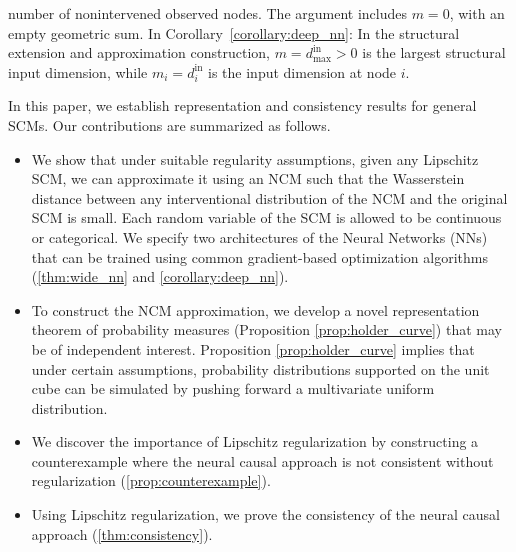 \documentclass[12pt]{article}
\theoremstyle{plain}
\theoremstyle{definition}
\theoremstyle{remark}
\begin{document}
number of nonintervened observed nodes. The argument includes $m=0$, with an empty geometric sum. In Corollary~\ref{corollary:deep_nn}: In the structural extension and approximation construction, $m=d_{\max}^{\text{in}}>0$ is the largest structural input dimension, while $m_i=d_i^{\text{in}}$ is the input dimension at node $i$.


In this paper, we establish representation and consistency results for general SCMs. Our contributions are summarized as follows.
\begin{itemize}
  \item We show that under suitable regularity assumptions, given any Lipschitz SCM, we can approximate it using an NCM such that the Wasserstein distance between any interventional distribution of the NCM and the original SCM is small. Each random variable of the SCM is allowed to be continuous or categorical. We specify two architectures of the Neural Networks (NNs) that can be trained using common gradient-based optimization algorithms (\cref{thm:wide_nn} and \cref{corollary:deep_nn}).
  \item To construct the NCM approximation, we develop a novel representation theorem of probability measures (Proposition \ref{prop:holder_curve}) that may be of independent interest. Proposition \ref{prop:holder_curve} implies that under certain assumptions, probability distributions supported on the unit cube can be simulated by pushing forward a multivariate uniform distribution.
  \item  We discover the importance of Lipschitz regularization by constructing a counterexample where the neural causal approach is not consistent without regularization (\cref{prop:counterexample}). 
  \item Using Lipschitz regularization, we prove the consistency of the neural causal approach (\cref{thm:consistency}). 
\end{itemize}

\end{document}
